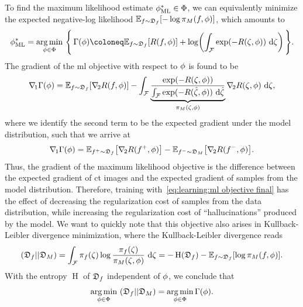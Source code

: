 \documentclass[../ml-ct.tex]{subfiles}
\begin{document}
To find the maximum likelihood estimate \( \phi^*_{\text{ML}} \in \Phi \), we can equivalently minimize the expected negative-log likelihood \( \mathbb{E}_{f \sim \mathfrak{D}_{f}} [-\log \pi_{M}(f, \phi)]\), which amounts to
\begin{equation}
	\optimal{\params}{ML} = \argmin_{\params \in \Phi}\ \Biggl\{\, \NLL(\params) \coloneq \mathbb{E}_{f \sim \distr{f}}[R(f, \params)] + \log\biggl( \int_{\set{F}} \exp(-R(\zeta, \params))\ \dd\zeta \biggr)\,\Biggr\}.
\end{equation}
The gradient of the \gls{ml} objective with respect to \( \phi \) is found to be
\begin{equation}
	\nabla_{\kern-0.3ex1} \Gamma(\phi) = \mathbb{E}_{f \sim \mathfrak{D}_{f}} [\nabla_{\kern-0.3ex2} R(f, \phi)] - \int_{\mathcal{F}} \underbrace{\frac{\exp(-R(\zeta, \phi))}{\int_{\mathcal{F}} \exp(-R(\hat{\zeta}, \phi))\ \mathrm{d} \hat{\zeta}}}_{\pi_{M}(\zeta, \phi)} \nabla_{\kern-0.3ex2} R(\zeta, \phi)\ \mathrm{d} \zeta,
\end{equation}
where we identify the second term to be the expected gradient under the model distribution, such that we arrive at
\begin{equation}
	\grad{1} \NLL(\params) = \mathbb{E}_{f^+ \sim \distr{f}} \bigl[ \grad{2}R(f^+, \params) \bigr] - \mathbb{E}_{f^- \sim \distr{M}} \bigl[ \grad{2} R(f^-, \params) \bigr].%
	\label{eq:learning:ml objective final}
\end{equation}
Thus, the gradient of the maximum likelihood objective is the difference between the expected gradient of \gls{ct} images and the expected gradient of samples from the model distribution.
Therefore, training with~\cref{eq:learning:ml objective final} has the effect of decreasing the regularization cost of samples from the data distribution, while increasing the regularization cost of \enquote{hallucinations} produced by the model.
We want to quickly note that this objective also arises in Kullback-Leibler divergence minimization, where the Kullback-Leibler divergence reads
\begin{equation}
	(\mathfrak{D}_{f} || \mathfrak{D}_{M}) = \int_{\mathcal{F}} \pi_{f}(\zeta) \log \frac{\pi_{f}(\zeta)}{\pi_{M}(\zeta, \phi)}\ \mathrm{d} \zeta = -\operatorname{H}(\mathfrak{D}_{f}) - \mathbb{E}_{f \sim \mathfrak{D}_{f}} [\log \pi_{M}(f, \phi)].
\end{equation}
With the entropy \( \operatorname{H} \) of \( \mathfrak{D}_{f} \) independent of \( \phi \), we conclude that
\begin{equation}
	\operatorname*{arg\,min}_{\phi \in \Phi}\ (\mathfrak{D}_{f} || \mathfrak{D}_{M}) = \operatorname*{arg\,min}_{\phi \in \Phi} \Gamma(\phi).
\end{equation}
\end{document}
